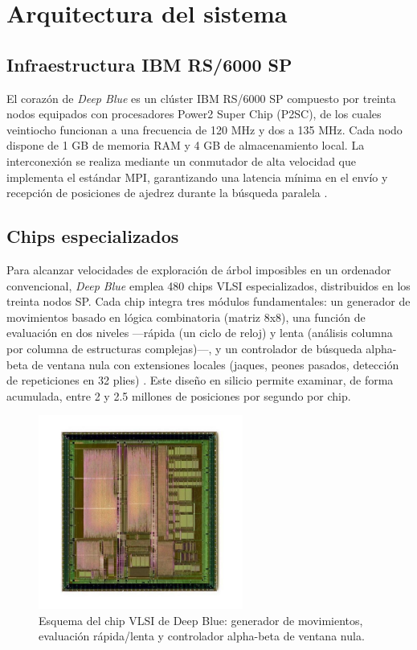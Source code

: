 \documentclass[a4paper, 12pt]{article}
\begin{document}
\section{Arquitectura del sistema}

\subsection{Infraestructura IBM RS/6000 SP}

El corazón de \textit{Deep Blue} es un clúster IBM RS/6000 SP 
compuesto por treinta nodos equipados con procesadores Power2 
Super Chip (P2SC), de los cuales veintiocho funcionan a una 
frecuencia de 120 MHz y dos a 135 MHz. Cada nodo dispone de 1 GB 
de memoria RAM y 4 GB de almacenamiento local. La interconexión 
se realiza mediante un conmutador de alta velocidad que 
implementa el estándar MPI, garantizando una latencia mínima en 
el envío y recepción de posiciones de ajedrez durante la 
búsqueda paralela \cite{Campbell2002, hsu1999ibm}.

\subsection{Chips especializados}

Para alcanzar velocidades de exploración de árbol imposibles en 
un ordenador convencional, \textit{Deep Blue} emplea 480 chips 
VLSI especializados, distribuidos en los treinta nodos SP. Cada 
chip integra tres módulos fundamentales: un generador de 
movimientos basado en lógica combinatoria (matriz 8x8), una 
función de evaluación en dos niveles —rápida (un ciclo de reloj) 
y lenta (análisis columna por columna de estructuras complejas)—, 
y un controlador de búsqueda alpha-beta de ventana nula con 
extensiones locales (jaques, peones pasados, detección de 
repeticiones en 32 plies) \cite{Campbell2002}. Este diseño en 
silicio permite examinar, de forma acumulada, entre 2 y 2.5 
millones de posiciones por segundo por chip. \cite{hsu1999ibm}

\begin{figure}[h]
    \centering
    \includegraphics[width=0.6\textwidth]{assets/deep-blue-chip.jpg}
    \caption{Esquema del chip VLSI de Deep Blue: generador de movimientos, evaluación rápida/lenta y controlador alpha-beta de ventana nula.}
    \label{fig:chip_vlsi}
\end{figure}
\end{document}
